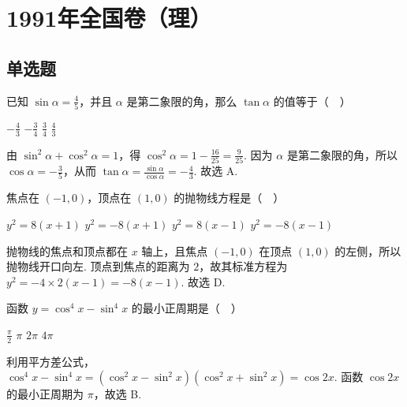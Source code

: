 \chapter{1991年全国卷（理）}
\section{单选题}

\begin{problem}
已知 \(\sin \alpha = \frac{4}{5}\)，并且 \(\alpha\) 是第二象限的角，那么 \(\tan \alpha\) 的值等于（\(\quad\)）

\choices
    {\(-\frac{4}{3}\)}
    {\(-\frac{3}{4}\)}
    {\(\frac{3}{4}\)}
    {\(\frac{4}{3}\)}


\begin{solution}
由 \(\sin^2\alpha+\cos^2\alpha=1\)，得 \(\cos^2\alpha=1-\frac{16}{25}=\frac{9}{25}\). 因为 \(\alpha\) 是第二象限的角，所以 \(\cos\alpha=-\frac{3}{5}\)，从而 \(\tan\alpha=\frac{\sin\alpha}{\cos\alpha}=-\frac{4}{3}\). 故选 A.
\end{solution}
\end{problem}

\begin{problem}
焦点在 \(\left(-1,0\right)\)，顶点在 \(\left(1,0\right)\) 的抛物线方程是（\(\quad\)）

\choices
    {\(y^{2}=8\left(x+1\right)\)}
    {\(y^{2}=-8\left(x+1\right)\)}
    {\(y^{2}=8\left(x-1\right)\)}
    {\(y^{2}=-8\left(x-1\right)\)}


\begin{solution}
抛物线的焦点和顶点都在 \(x\) 轴上，且焦点 \((-1,0)\) 在顶点 \((1,0)\) 的左侧，所以抛物线开口向左. 顶点到焦点的距离为 \(2\)，故其标准方程为 \(y^2=-4\times2\left(x-1\right)=-8\left(x-1\right)\). 故选 D.
\end{solution}
\end{problem}

\begin{problem}
函数 \(y=\cos^4 x-\sin^4 x\) 的最小正周期是（\(\quad\)）

\choices
    {\(\frac{\pi}{2}\)}
    {\(\pi\)}
    {\(2\pi\)}
    {\(4\pi\)}


\begin{solution}
利用平方差公式，\(\cos^4x-\sin^4x=\left(\cos^2x-\sin^2x\right)\left(\cos^2x+\sin^2x\right)=\cos2x\). 函数 \(\cos2x\) 的最小正周期为 \(\pi\)，故选 B.
\end{solution}
\end{problem}

